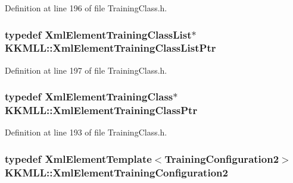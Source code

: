 Definition at line 196 of file Training\+Class.\+h.

\subsubsection[{\texorpdfstring{Xml\+Element\+Training\+Class\+List\+Ptr}{XmlElementTrainingClassListPtr}}]{\setlength{\rightskip}{0pt plus 5cm}typedef {\bf Xml\+Element\+Training\+Class\+List}$\ast$ {\bf K\+K\+M\+L\+L\+::\+Xml\+Element\+Training\+Class\+List\+Ptr}}\hypertarget{namespace_k_k_m_l_l_a8ae9fd07b357de52682cd901474fd163}{}\label{namespace_k_k_m_l_l_a8ae9fd07b357de52682cd901474fd163}


Definition at line 197 of file Training\+Class.\+h.

\subsubsection[{\texorpdfstring{Xml\+Element\+Training\+Class\+Ptr}{XmlElementTrainingClassPtr}}]{\setlength{\rightskip}{0pt plus 5cm}typedef {\bf Xml\+Element\+Training\+Class}$\ast$ {\bf K\+K\+M\+L\+L\+::\+Xml\+Element\+Training\+Class\+Ptr}}\hypertarget{namespace_k_k_m_l_l_ad7b832063ec35b235e0f6523678a4fc1}{}\label{namespace_k_k_m_l_l_ad7b832063ec35b235e0f6523678a4fc1}


Definition at line 193 of file Training\+Class.\+h.

\subsubsection[{\texorpdfstring{Xml\+Element\+Training\+Configuration2}{XmlElementTrainingConfiguration2}}]{\setlength{\rightskip}{0pt plus 5cm}typedef {\bf Xml\+Element\+Template}$<${\bf Training\+Configuration2}$>$ {\bf K\+K\+M\+L\+L\+::\+Xml\+Element\+Training\+Configuration2}}\hypertarget{namespace_k_k_m_l_l_a959ad458aebdb6b8716a6946c6d0f720}{}\label{namespace_k_k_m_l_l_a959ad458aebdb6b8716a6946c6d0f720}



